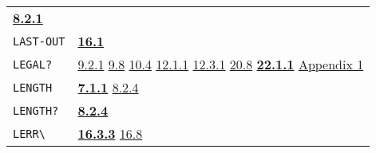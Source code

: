 \documentclass[a4paper]{scrbook}
\begin{document}
\begin{longtable}[]{@{}ll@{}}
\begin{minipage}[t]{0.70\columnwidth}
\textbf{\href{08-truth.md\#821-arithmetic-1}{8.2.1}}\strut
\end{minipage}\tabularnewline
\begin{minipage}[t]{0.24\columnwidth}\raggedright\strut
\texttt{LAST-OUT}\strut
\end{minipage} & \begin{minipage}[t]{0.70\columnwidth}\raggedright\strut
\textbf{\href{16-errors-frames-etc.md\#161-listen}{16.1}}\strut
\end{minipage}\tabularnewline
\begin{minipage}[t]{0.24\columnwidth}\raggedright\strut
\texttt{LEGAL?}\strut
\end{minipage} & \begin{minipage}[t]{0.70\columnwidth}\raggedright\strut
\href{09-functions.md\#921-tuple-and-tuple-the-type-1}{9.2.1}
\href{09-functions.md\#98-activation-name-act-again-and-return-1}{9.8} \href{10-looping.md\#104-go-and-tag}{10.4}
\href{12-locatives.md\#1211-lloc}{12.1.1} \href{12-locatives.md\#1231-in}{12.3.1}
\href{20-coroutines.md\#208-sneakiness-with-processes}{20.8}
\textbf{\href{22-storage-management.md\#2211-stacks-and-other-internal-vectors}{22.1.1}}
\href{appendix-1-a-look-inside.md\#appendix-1-a-look-inside}{Appendix 1}\strut
\end{minipage}\tabularnewline
\begin{minipage}[t]{0.24\columnwidth}\raggedright\strut
\texttt{LENGTH}\strut
\end{minipage} & \begin{minipage}[t]{0.70\columnwidth}\raggedright\strut
\textbf{\href{07-structured-objects.md\#711-length-1}{7.1.1}} \href{08-truth.md\#824-object-properties-1}{8.2.4}\strut
\end{minipage}\tabularnewline
\begin{minipage}[t]{0.24\columnwidth}\raggedright\strut
\texttt{LENGTH?}\strut
\end{minipage} & \begin{minipage}[t]{0.70\columnwidth}\raggedright\strut
\textbf{\href{08-truth.md\#824-object-properties-1}{8.2.4}}\strut
\end{minipage}\tabularnewline
\begin{minipage}[t]{0.24\columnwidth}\raggedright\strut
\texttt{LERR\textbackslash{}}\strut
\end{minipage} & \begin{minipage}[t]{0.70\columnwidth}\raggedright\strut
\textbf{\href{16-errors-frames-etc.md\#1633-frame-the-subr}{16.3.3}}
\href{16-errors-frames-etc.md\#168-control-s-s}{16.8}\strut

\end{minipage}
\end{longtable}
\end{document}
